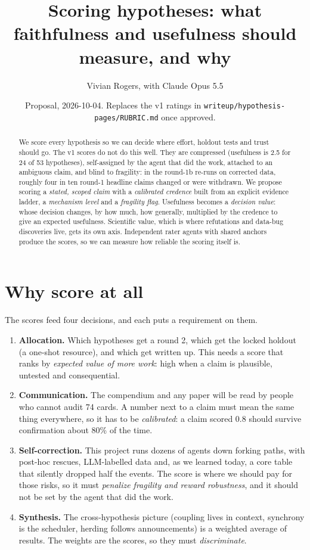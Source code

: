 \documentclass[aps,pre,reprint,10pt,nofootinbib]{revtex4-2}
\begin{document}
\title{Scoring hypotheses: what faithfulness and usefulness should measure, and why}
\author{Vivian Rogers, with Claude Opus 5.5}
\date[]{Proposal, 2026-10-04. Replaces the v1 ratings in \texttt{writeup/hypothesis-pages/RUBRIC.md} once approved.}
\begin{abstract}
We score every hypothesis so we can decide where effort, holdout tests and trust should go. The v1 scores do not do this well. They are compressed (usefulness is 2.5 for 24 of 53 hypotheses), self-assigned by the agent that did the work, attached to an ambiguous claim, and blind to fragility: in the round-1b re-runs on corrected data, roughly four in ten round-1 headline claims changed or were withdrawn. We propose scoring a \emph{stated, scoped claim} with a \emph{calibrated credence} built from an explicit evidence ladder, a \emph{mechanism level} and a \emph{fragility flag}. Usefulness becomes a \emph{decision value}: whose decision changes, by how much, how generally, multiplied by the credence to give an expected usefulness. Scientific value, which is where refutations and data-bug discoveries live, gets its own axis. Independent rater agents with shared anchors produce the scores, so we can measure how reliable the scoring itself is.
\end{abstract}
\maketitle

\section{Why score at all}
The scores feed four decisions, and each puts a requirement on them.
\begin{enumerate}
\item \textbf{Allocation.} Which hypotheses get a round 2, which get the locked holdout (a one-shot resource), and which get written up. This needs a score that ranks by \emph{expected value of more work}: high when a claim is plausible, untested and consequential.
\item \textbf{Communication.} The compendium and any paper will be read by people who cannot audit 74 cards. A number next to a claim must mean the same thing everywhere, so it has to be \emph{calibrated}: a claim scored 0.8 should survive confirmation about 80\% of the time.
\item \textbf{Self-correction.} This project runs dozens of agents down forking paths, with post-hoc rescues, LLM-labelled data and, as we learned today, a core table that silently dropped half the events. The score is where we should pay for those risks, so it must \emph{penalize fragility and reward robustness}, and it should not be set by the agent that did the work.
\item \textbf{Synthesis.} The cross-hypothesis picture (coupling lives in context, synchrony is the scheduler, herding follows announcements) is a weighted average of results. The weights are the scores, so they must \emph{discriminate}.
\end{enumerate}
\end{document}

